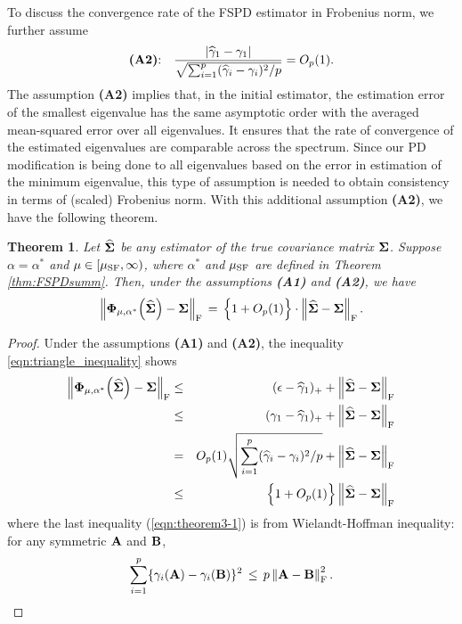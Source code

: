 \documentclass[times,sort&compress,3p]{elsarticle}
\newtheorem{theorem}{Theorem}
\begin{document}
To discuss the convergence rate of the FSPD estimator in Frobenius norm, we further assume
\[
\mbox{{\bf(A2)}:} \quad \frac{  |{\widehat{\gamma}}_1 - \gamma_1 |}{ \sqrt{\sum_{i=1}^p ({\widehat{\gamma}}_i - \gamma_i)^2 / p} } = O_p ( 1). 
\]
The assumption {\bf (A2)} implies that, in the initial estimator, the estimation error of the smallest eigenvalue
has the same asymptotic order with the averaged mean-squared error over all eigenvalues. It 
ensures that the rate of convergence of the estimated eigenvalues are comparable across the spectrum. 
Since our PD modification is being done to all eigenvalues based on the error in estimation of the minimum 
eigenvalue, this type of assumption is needed to obtain consistency in terms of (scaled) Frobenius norm.
With this additional assumption {\bf (A2)}, we have the following theorem.
%
\begin{theorem}\label{prop:FSPDcov2} 
Let $\widehat{\bf \Sigma}$ be any estimator of the true covariance matrix ${\bf \Sigma}$. Suppose 
$\alpha=\alpha^*$ and $\mu \in [\mu_{\rm SF}, \infty)$, where $\alpha^*$ and $\mu_{\rm SF}$
are defined in Theorem \ref{thm:FSPDsumm}. Then, under the assumptions {\bf (A1)} and {\bf (A2)}, 
we have 
\[
\left\| {\bf \Phi}_{\mu, \alpha^*}\Big(\widehat{\bf \Sigma}\Big) - {\bf \Sigma} \right\|_{\rm F} \,=\,  
	\Big\{ 1 + O_p(1) \Big\} \cdot
	\left\| \widehat{\bf \Sigma} - {\bf \Sigma} \right\|_{\rm F}.
\]
\end{theorem}
\begin{proof}
Under the assumptions {\bf (A1)} and {\bf (A2)}, the inequality \eqref{eqn:triangle_inequality} shows 
\begin{eqnarray}
\left\| {\bf \Phi}_{\mu, \alpha^*}\Big(\widehat{\bf \Sigma}\Big) - {\bf \Sigma} \right\|_{\rm F} &\leq&
	(\epsilon - {\widehat{\gamma}}_1)_+  +  \left\| \widehat{\bf \Sigma} - {\bf \Sigma} \right\|_{\rm F}\nonumber\\
 	&\leq& (\gamma_1 - {\widehat{\gamma}}_1)_+  +  \left\| \widehat{\bf \Sigma} - {\bf \Sigma} \right\|_{\rm F} \nonumber \\
&=&  O_p (1) \sqrt{\sum_{i=1}^p ({\widehat{\gamma}}_i - \gamma_i)^2 / p}+  \left\| \widehat{\bf \Sigma} - {\bf \Sigma}
\right\|_{\rm F} \nonumber \\
&\le & \Big\{ 1 + O_p(1) \Big\}    \left\| \widehat{\bf \Sigma} - {\bf \Sigma} \label{eqn:theorem3-1}
\right\|_{\rm F}
\end{eqnarray}
where the last inequality (\ref{eqn:theorem3-1}) is from Wielandt-Hoffman inequality: for any  symmetric $\bf A$ and $\bf B$,
\[
\sum_{i=1}^{p} \{ \gamma_i({\bf A}) - \gamma_i({\bf B}) \}^2 \,\leq\, p \left\|{\bf A} - {\bf B}\right\|_{\rm F}^2.
\]
\end{proof}
\end{document}
